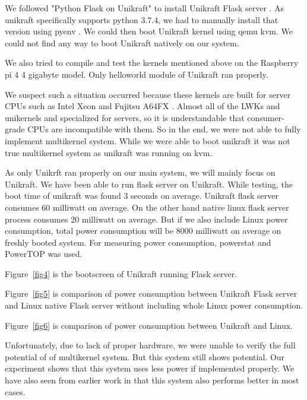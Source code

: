 \documentclass[11pt]{article}       %
\begin{document}
We followed "Python Flask on Unikraft" to install Unikraft Flask server \cite{DEL18}. As unikraft specifically supports python 3.7.4, we had to manually install that version using pyenv \cite{DEL27}. We could then boot Unikraft kernel using qemu kvm. We could not find any way to boot Unikraft natively on our system.


We also tried to compile and test the kernels mentioned above on the Raspberry pi 4 4 gigabyte model. Only helloworld module of Unikraft ran properly.  


We suspect such a situation occurred because these kernels are built for server CPUs such as Intel Xeon and Fujitsu A64FX \cite{DEL01} \cite{DEL02} \cite{DEL04}. Almost all of the LWKs and unikernels and specialized for servers, so it is understandable that consumer-grade CPUs are incompatible with them. So in the end, we were not able to fully implement multikernel system. While we were able to boot unikraft it was not true multikernel system as unikraft was running on kvm.


As only Unikrft ran properly on our main system, we will mainly focus on Unikraft. We have been able to run flask server on Unikraft. While testing, the boot time of unikraft was found 3 seconds on average. Unikraft flask server consumes 60 milliwatt on average. On the other hand native linux flask server process consumes 20 milliwatt on average. But if we also include Linux power consumption, total power consumption will be 8000 milliwatt on average on freshly booted system. For measuring power consumption, powerstat  \cite{DEL21} and PowerTOP \cite{DEL20} was used.

Figure~\ref{fig4} is the bootscreen of Unikraft running Flask server.

Figure~\ref{fig5} is comparison of power consumption between Unikraft Flask server and Linux native Flask server without including whole Linux power consumption. 


Figure~\ref{fig6} is comparison of power consumption between Unikraft and Linux.


Unfortunately, due to lack of proper hardware, we were unable to verify the full potential of of multikernel system. But this system still shows potential. Our experiment shows that this system uses less power if implemented properly. We have also seen from earlier work in \cite{DEL14} that this system also performs better in most cases. 



\end{document}
